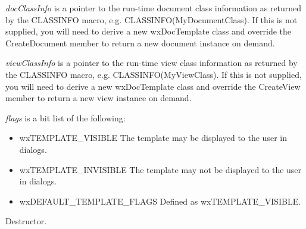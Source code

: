 {\it docClassInfo} is a pointer to the run-time document class information as returned
by the CLASSINFO macro, e.g. CLASSINFO(MyDocumentClass). If this is not supplied,
you will need to derive a new wxDocTemplate class and override the CreateDocument
member to return a new document instance on demand.

{\it viewClassInfo} is a pointer to the run-time view class information as returned
by the CLASSINFO macro, e.g. CLASSINFO(MyViewClass). If this is not supplied,
you will need to derive a new wxDocTemplate class and override the CreateView
member to return a new view instance on demand.

{\it flags} is a bit list of the following:

\begin{itemize}\itemsep=0pt
\item wxTEMPLATE\_VISIBLE The template may be displayed to the user in dialogs.
\item wxTEMPLATE\_INVISIBLE The template may not be displayed to the user in dialogs.
\item wxDEFAULT\_TEMPLATE\_FLAGS Defined as wxTEMPLATE\_VISIBLE.
\end{itemize}




Destructor.

